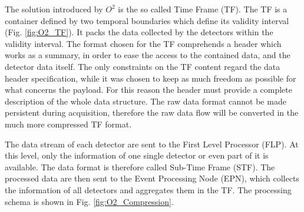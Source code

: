 The solution introduced by $O^2$ is the so called Time Frame (TF).
The TF is a container defined by two temporal boundaries which define its validity interval (Fig. \ref{fig:O2_TF}).
It packs the data collected by the detectors within the validity interval.
The format chosen for the TF comprehends a header which works as a summary, in order to ease the access to the contained data, and the detector data itself.
The only constraints on the TF content regard the data header specification, while it was chosen to keep as much freedom as possible for what concerns the payload.
For this reason the header must provide a complete description of the whole data structure.
The raw data format cannot be made persistent during acquisition, therefore the raw data flow will be converted in the much more compressed TF format.

The data stream of each detector are sent to the First Level Processor (FLP). 
At this level, only the information of one single detector or even part of it is available.
The data format is therefore called Sub-Time Frame (STF).
The processed data are then sent to the Event Processing Node (EPN), which collects the information of all detectors and aggregates them in the TF.
The processing schema is shown in Fig. \ref{fig:O2_Compression}.


